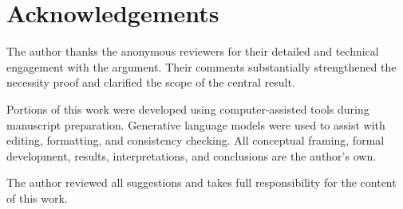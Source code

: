 \section*{Acknowledgements}

The author thanks the anonymous reviewers for their detailed and
technical engagement with the argument.
Their comments substantially strengthened the necessity proof
and clarified the scope of the central result.

Portions of this work were developed
using computer-assisted tools during manuscript preparation.
Generative language models were used to assist with editing, formatting,
and consistency checking.
All conceptual framing, formal development, results, interpretations, and conclusions
are the author's own.

The author reviewed all suggestions and
takes full responsibility for the content of this work.
